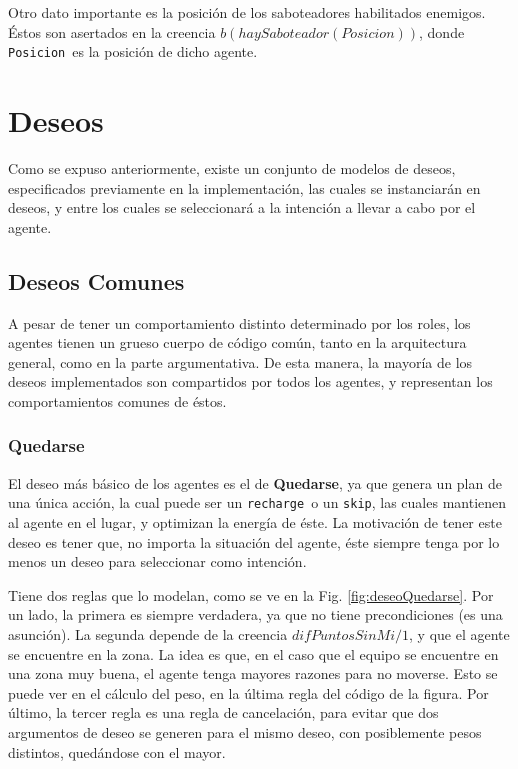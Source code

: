 \documentclass[oneside]{book}
\theoremstyle{definition}
\theoremstyle{example}
\newcommand{\lit}[1]{\mbox{$ #1$}}
\begin{document}
Otro dato importante es la posición de los saboteadores habilitados enemigos.
Éstos son asertados en la creencia \lit{b(haySaboteador(Posicion))}, donde 
\texttt{Posicion}\ es la posición de dicho agente.

\section{Deseos}

Como se expuso anteriormente, existe un conjunto de modelos de deseos, especificados
previamente en la implementación, las cuales se instanciarán en deseos, y entre los 
cuales se seleccionará a la intención a llevar a cabo por el agente.

\subsection{Deseos Comunes}

\label{sec:deseosComunes}

A pesar de tener un comportamiento distinto determinado por los roles, los agentes
tienen un grueso cuerpo de código común, tanto en la arquitectura general, como 
en la parte argumentativa. De esta manera, la mayoría de los deseos implementados son
compartidos por todos los agentes, y representan los comportamientos comunes de éstos.

\subsubsection{Quedarse}

El deseo más básico de los agentes es el de \textbf{Quedarse}, ya que genera un plan de 
una única acción, la cual puede ser un \texttt{recharge}\ o un \texttt{skip}, las cuales
mantienen al agente en el lugar, y optimizan la energía de éste. La 
motivación de tener este deseo es tener que, no importa la situación del agente, éste
siempre tenga por lo menos un deseo para seleccionar como intención.

Tiene dos reglas que lo modelan, como se ve en la Fig. \ref{fig:deseoQuedarse}. Por un
lado, la primera es siempre verdadera, ya que no tiene precondiciones (es una asunción).
La segunda depende de la creencia \lit{difPuntosSinMi/1}, y que el agente se encuentre
en la zona. La idea es que, en el caso que el equipo se encuentre en una zona muy buena,
el agente tenga mayores razones para no moverse. Esto se puede ver en el cálculo del 
peso, en la última regla del código de la figura. Por último, la tercer regla es una
regla de cancelación, para evitar que dos argumentos de deseo se generen para el mismo
deseo, con posiblemente pesos distintos, quedándose con el mayor.
\end{document}
